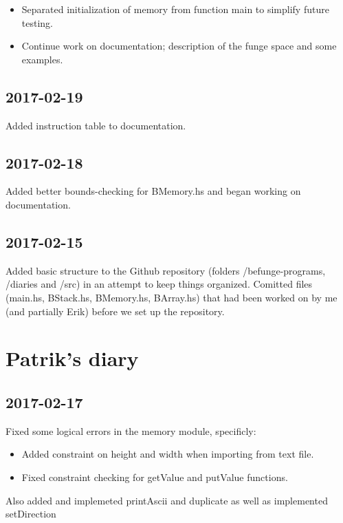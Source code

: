 \documentclass[12pt, a4paper]{article}
\begin{document}
\begin{itemize}
\item Separated initialization of memory from function main to simplify future
  testing.
\item Continue work on documentation; description of the funge space and some
  examples.
\end{itemize}

\subsection*{2017-02-19}

Added instruction table to documentation.

\subsection*{2017-02-18}

Added better bounds-checking for BMemory.hs and began working on documentation.

\subsection*{2017-02-15}

Added basic structure to the Github repository (folders /befunge-programs, /diaries and /src) in an attempt to keep things organized. Comitted files (main.hs, BStack.hs, BMemory.hs, BArray.hs) that had been worked on by me (and partially Erik) before we set up the repository.

\section*{Patrik's diary}

\subsection*{2017-02-17}

Fixed some logical errors in the memory module, specificly:
\begin{itemize}
\item Added constraint on height and width when importing from text file.
\item Fixed constraint checking for getValue and putValue functions.
\end{itemize}

Also added and implemeted printAscii and duplicate as well as implemented setDirection
\end{document}
